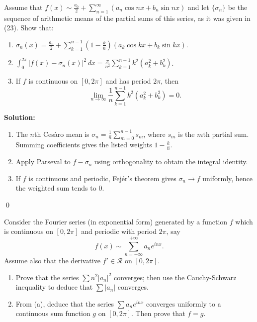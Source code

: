 \begin{problembox}
Assume that $f(x) \sim \frac{a_0}{2} + \sum_{n=1}^\infty (a_n \cos nx + b_n \sin nx)$ and let $\{\sigma_n\}$ be the sequence of arithmetic means of the partial sums of this series, as it was given in (23). Show that:
\begin{enumerate}[label=(\alph*)]
\item $\sigma_n(x) = \frac{a_0}{2} + \sum_{k=1}^{n-1} \left(1 - \frac{k}{n}\right) (a_k \cos kx + b_k \sin kx)$.
\item $\int_0^{2\pi} |f(x) - \sigma_n(x)|^2 \, dx = \frac{\pi}{n^2} \sum_{k=1}^{n-1} k^2 (a_k^2 + b_k^2)$.
\item If $f$ is continuous on $[0, 2\pi]$ and has period $2\pi$, then
\[
\lim_{n \to \infty} \frac{1}{n} \sum_{k=1}^{n-1} k^2 (a_k^2 + b_k^2) = 0.
\]
\end{enumerate}
\end{problembox}

\noindent\textbf{Solution:}
\begin{enumerate}[label=(\alph*)]
\item The $n$th Cesàro mean is $\sigma_n=\tfrac{1}{n}\sum_{m=0}^{n-1} s_m$, where $s_m$ is the $m$th partial sum. Summing coefficients gives the listed weights $1-\tfrac{k}{n}$.
\item Apply Parseval to $f-\sigma_n$ using orthogonality to obtain the integral identity.
\item If $f$ is continuous and periodic, Fejér's theorem gives $\sigma_n\to f$ uniformly, hence the weighted sum tends to $0$.
\end{enumerate}\qed


\begin{problembox}
Consider the Fourier series (in exponential form) generated by a function $f$ which is continuous on $[0, 2\pi]$ and periodic with period $2\pi$, say
\[
f(x) \sim \sum_{n=-\infty}^{+\infty} a_n e^{inx}.
\]
Assume also that the derivative $f' \in \mathcal{R}$ on $[0, 2\pi]$. 
\begin{enumerate}[label=(\alph*)]
\item Prove that the series $\sum n^2 |a_n|^2$ converges; then use the Cauchy-Schwarz inequality to deduce that $\sum |a_n|$ converges.
\item From (a), deduce that the series $\sum a_n e^{inx}$ converges uniformly to a continuous sum function $g$ on $[0, 2\pi]$. Then prove that $f = g$.
\end{enumerate}
\end{problembox}


